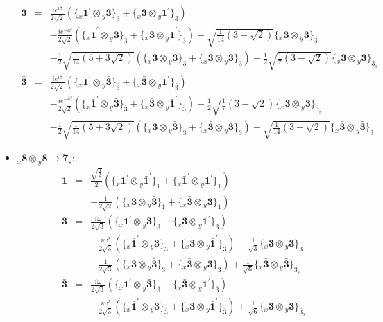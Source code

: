 \documentclass[english]{article}
\newcommand{\rep}[1]{\mathbf{#1}}
\newcommand{\repx}[2]{{}_{#2}\mathbf{#1}}
\newcommand{\subcg}[3]{\big\{ \repx{#1}{x}\otimes\repx{#2}{y}\big\}^{}_{#3}}
\begin{document}
\begin{itemize}
\begin{eqnarray*}
\rep{3} &=& \frac{i e^{i \beta }}{2 \sqrt{2}}\left(\subcg{1^{\prime}}{3}{3}+\subcg{3}{1^{\prime}}{3}\right) \\ 
 & & -\frac{i e^{-i \beta }}{2 \sqrt{2}}\left(\subcg{\bar{1}^{\prime}}{3}{3}+\subcg{3}{\bar{1}^{\prime}}{3}\right)+\sqrt{\frac{1}{14} \left(3-\sqrt{2}\right)}\subcg{3}{3}{3} \\ 
 & & -\frac{1}{2} \sqrt{\frac{1}{14} \left(5+3 \sqrt{2}\right)}\left(\subcg{3}{\bar{3}}{3}+\subcg{\bar{3}}{3}{3}\right)+\frac{1}{2} \sqrt{\frac{1}{7} \left(3-\sqrt{2}\right)}\subcg{\bar{3}}{\bar{3}}{3_{s}}
\\
\rep{\bar{3}} &=& \frac{i e^{i \beta }}{2 \sqrt{2}}\left(\subcg{1^{\prime}}{\bar{3}}{\bar{3}}+\subcg{\bar{3}}{1^{\prime}}{\bar{3}}\right) \\ 
 & & -\frac{i e^{-i \beta }}{2 \sqrt{2}}\left(\subcg{\bar{1}^{\prime}}{\bar{3}}{\bar{3}}+\subcg{\bar{3}}{\bar{1}^{\prime}}{\bar{3}}\right)+\frac{1}{2} \sqrt{\frac{1}{7} \left(3-\sqrt{2}\right)}\subcg{3}{3}{\bar{3}_{s}} \\ 
 & & -\frac{1}{2} \sqrt{\frac{1}{14} \left(5+3 \sqrt{2}\right)}\left(\subcg{3}{\bar{3}}{\bar{3}}+\subcg{\bar{3}}{3}{\bar{3}}\right)+\sqrt{\frac{1}{14} \left(3-\sqrt{2}\right)}\subcg{\bar{3}}{\bar{3}}{\bar{3}}
\end{eqnarray*}
\item $\repx{8}{x}\otimes\repx{8}{y}\to\rep{7}_{s}$:
\begin{eqnarray*}
\rep{1} &=& \frac{\sqrt{\frac{3}{2}}}{2}\left(\subcg{1^{\prime}}{\bar{1}^{\prime}}{1}+\subcg{\bar{1}^{\prime}}{1^{\prime}}{1}\right) \\ 
 & & -\frac{1}{2 \sqrt{2}}\left(\subcg{3}{\bar{3}}{1}+\subcg{\bar{3}}{3}{1}\right)
\\
\rep{3} &=& \frac{i \omega }{2 \sqrt{3}}\left(\subcg{1^{\prime}}{3}{3}+\subcg{3}{1^{\prime}}{3}\right) \\ 
 & & -\frac{i \omega ^2}{2 \sqrt{3}}\left(\subcg{\bar{1}^{\prime}}{3}{3}+\subcg{3}{\bar{1}^{\prime}}{3}\right)-\frac{1}{\sqrt{3}}\subcg{3}{3}{3} \\ 
 & & +\frac{1}{2 \sqrt{3}}\left(\subcg{3}{\bar{3}}{3}+\subcg{\bar{3}}{3}{3}\right)+\frac{1}{\sqrt{6}}\subcg{\bar{3}}{\bar{3}}{3_{s}}
\\
\rep{\bar{3}} &=& \frac{i \omega }{2 \sqrt{3}}\left(\subcg{1^{\prime}}{\bar{3}}{\bar{3}}+\subcg{\bar{3}}{1^{\prime}}{\bar{3}}\right) \\ 
 & & -\frac{i \omega ^2}{2 \sqrt{3}}\left(\subcg{\bar{1}^{\prime}}{\bar{3}}{\bar{3}}+\subcg{\bar{3}}{\bar{1}^{\prime}}{\bar{3}}\right)+\frac{1}{\sqrt{6}}\subcg{3}{3}{\bar{3}_{s}} \\ 

\end{eqnarray*}
\end{itemize}
\end{document}
